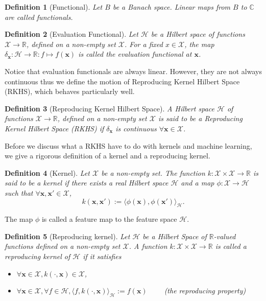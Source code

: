 \documentclass[12pt,a4paper,oneside]{book}
\newtheorem{Definition}{Definition}
\begin{document}
\begin{Definition}[Functional]
Let $B$ be a Banach space. Linear maps from $B$ to $\mathbb{C}$ are called functionals.
\end{Definition}

\begin{Definition}[Evaluation Functional]
Let $\mathcal{H}$ be a Hilbert space of functions $\mathcal{X} \rightarrow \mathbb{R}$, defined on a non-empty set $\mathcal{X}$. For a fixed $x \in \mathcal{X}$, the map $\delta_{\bm{x}} : \mathcal{H} \rightarrow \mathbb{R}: f \mapsto f(\bm{x})$ is called the evaluation functional at $\bm{x}$. 
\end{Definition}

Notice that evaluation functionals are always linear. However, they are not always continuous thus we define the motion of Reproducing Kernel Hilbert Space (RKHS), which behaves particularly well.

\begin{Definition}[Reproducing Kernel Hilbert Space]
A Hilbert space $\mathcal{H}$ of functions $\mathcal{X} \rightarrow \mathbb{R}$, defined on a non-empty set $\mathcal{X}$ is said to be a Reproducing Kernel Hilbert Space (RKHS) if $\delta_{\bm{x}}$ is continuous $\forall \bm{x} \in \mathcal{X}$.
\end{Definition}

Before we discuss what a RKHS have to do with kernels and machine learning, we give a rigorous definition of a kernel and a reproducing kernel.

\begin{Definition}[Kernel] \label{Functional_Kernel}
Let $\mathcal{X}$ be a non-empty set. The function $k: \mathcal{X} \times \mathcal{X} \rightarrow \mathbb{R}$ is said to be a kernel if there exists a real Hilbert space $\mathcal{H}$ and a map $\phi : \mathcal{X} \rightarrow \mathcal{H}$ such that $\forall \bm{x},\bm{x}' \in \mathcal{X}$,
\begin{equation}
k(\bm{x},\bm{x}') := \langle \phi(\bm{x}),\phi(\bm{x}') \rangle_{\mathcal{H}}.
\end{equation}
\end{Definition}

The map $\phi$ is called a feature map to the feature space $\mathcal{H}$.

\begin{Definition}[Reproducing kernel]
Let $\mathcal{H}$ be a Hilbert Space of $\mathbb{R}$-valued functions defined on a non-empty set $\mathcal{X}$. A function $k: \mathcal{X} \times \mathcal{X} \rightarrow \mathbb{R}$ is called a reproducing kernel of $\mathcal{H}$ if it satisfies 
\begin{itemize}
\item $\forall \bm{x} \in \mathcal{X}, k(\cdot,\bm{x}) \in \mathcal{X}$,
\item $\forall \bm{x} \in \mathcal{X}, \forall f \in \mathcal{H}, \langle f,k(\cdot,\bm{x})\rangle_{\mathcal{H}} := f(\bm{x}) \qquad$ (the reproducing property)
\end{itemize}
\end{Definition}
\end{document}
